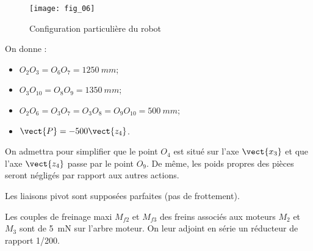 \begin{figure}[!h]
\centering
\texttt{[image: fig\_06]}
\caption{Configuration particulière du robot\label{kuka:fig:06}}
\end{figure}


On donne : 
\begin{itemize}
\item $O_2O_3 = O_6O_7 = \SI{1250}{mm}$; 
\item $O_3O_{10} = O_8O_9 = \SI{1350}{mm}$; 
\item $O_2O_6 = O_3O_7 = O_3O_8 = O_9O_{10} = \SI{500}{mm}$; 
\item $\vect{P} = -500\vect{z_4}$. 
\end{itemize}

On admettra pour simplifier que le point $O_4$ est situé sur l’axe $\vect{x_3}$ et que l’axe $\vect{z_4}$ passe par le point $O_9$. De même, les poids propres des pièces seront négligés par rapport aux autres 
actions. 

Les liaisons pivot sont supposées parfaites (pas de frottement). 

Les couples de freinage maxi $M_{f2}$ et $M_{f3}$ des freins associés aux moteurs $M_2$ et $M_3$ sont de 
\SI{5}{mN} sur l’arbre moteur. On leur adjoint en série un réducteur de rapport 1/200.
\fi

